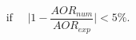 \begin{equation}
\text{if} ~~~~~~ \lvert{1-\frac{AOR_{num}}{AOR_{exp}}}\rvert < 5\% .
\label{eq:checkaor}
\end{equation}
